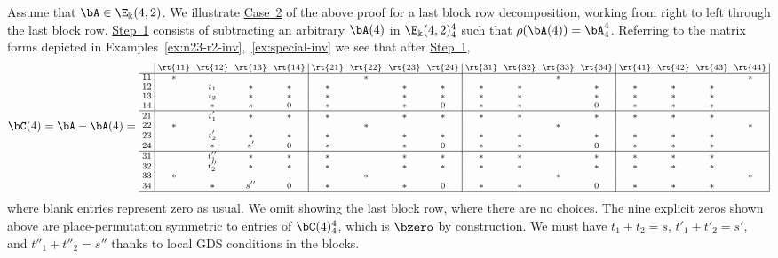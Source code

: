  

\begin{exam}\label{ex:decomp42}
Assume that $\bA \in \E_\Bbbk(4,2)$. We illustrate \hyperlink{Case 2}{Case~2} of the above
proof for a last block row decomposition, working from right to left
through the last block row. \hyperlink{Step 1}{Step~1} consists of subtracting an
arbitrary $\bA(4)$ in $\E_\Bbbk(4,2)^4_4$ such that
$\rho(\bA(4))=\bA^4_4$. Referring to the matrix forms depicted in
Examples~\ref{ex:n23-r2-inv},~\ref{ex:special-inv} we see that after
\hyperlink{Step 1}{Step~1},
\[
\bC(4) = \bA - \bA(4) = 
\text{\setlength{\arraycolsep}{2.7pt}\scriptsize
$\displaystyle 
\begin{array}{c|cccc|cccc|cccc|cccc|}
 &\rt{11}&\rt{12}&\rt{13}&\rt{14}&\rt{21}&\rt{22}&\rt{23}&\rt{24}&
 \rt{31}&\rt{32}&\rt{33}&\rt{34}&\rt{41}&\rt{42}&\rt{43}&\rt{44}\\ \hline
 11&*& & & & &*& & & & &*& & & & &*\\
 12& &t_1&*&*&*& &*&*&*&*& &*&*&*&* & \\
 13& &t_2&*&*&*& &*&*&*&*& &*&*&*&*& \\
 14& &*&s&0&*& &*&0&*&*& &0&*&*&*& \\ \hline
 21& &t'_1&*&*&*& &*&*&*&*& &*&*&*&*& \\ 
 22&*& & & & &*& & & & &*& & & & &*\\
 23& &t'_2&*&*&*& &*&*&*&*& &*&*&*&*& \\ 
 24& &*&s'&0&*& &*&0&*&*& &0&*&*&*& \\ \hline 
 31& &t''_1&*&*&*& &*&*&*&*& &*&*&*&*& \\
 32& &t''_2&*&*&*& &*&*&*&*& &*&*&*&*& \\
 33&*& & & & &*& & & & &*& & & & &*\\ 
 34& &*&s''&0&*& &*&0&*&*& &0&*&*&*& \\ \hline
\end{array} $}
\]
where blank entries represent zero as usual. We omit showing the last
block row, where there are no choices. The nine explicit zeros shown
above are place-permutation symmetric to entries of $\bC(4)^4_4$,
which is $\bzero$ by construction. We must have $t_1+t_2 = s$,
$t'_1+t'_2 = s'$, and $t''_1+t''_2 = s''$ thanks to local GDS
conditions in the blocks.


\end{exam}
